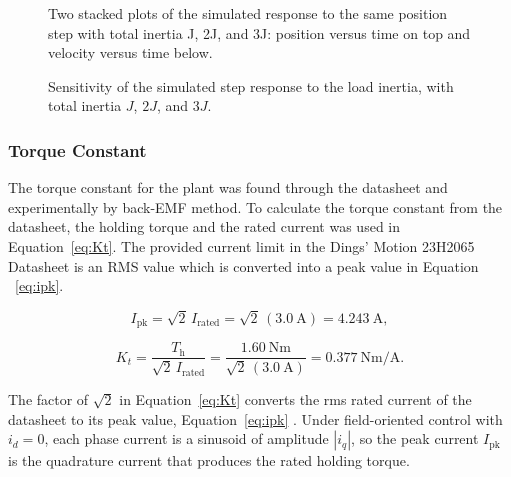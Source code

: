 \begin{figure}[htbp]
	\centering
		{Two stacked plots of the simulated response to the same position step with total inertia J, 2J, and 3J: position versus time on top and velocity versus time below.}
	\caption[Sensitivity of the step response to load inertia]{Sensitivity of the simulated step response to the load inertia, with total inertia $J$, $2J$, and $3J$.}
	\label{fig:inertia_sensitivity}
\end{figure}




\subsubsection{Torque Constant}
The torque constant for the plant was found through the datasheet and experimentally by back-EMF method. 
To calculate the torque constant from the datasheet, the holding torque and the rated current was used in Equation~\eqref{eq:Kt}. The provided current limit in the Dings' Motion 23H2065 Datasheet is an RMS value which is converted into a peak value in Equation ~\eqref{eq:ipk}.


\begin{equation}
	I_{\mathrm{pk}} = \sqrt{2}\, I_{\mathrm{rated}}
	= \sqrt{2}\,(\SI{3.0}{\ampere}) = \SI{4.243}{\ampere},\label{eq:ipk}
\end{equation}

\begin{equation}
	K_t = \frac{T_{\mathrm{h}}}{\sqrt{2}\, I_{\mathrm{rated}}}
	= \frac{\SI{1.60}{\newton\meter}}{\sqrt{2}\,(\SI{3.0}{\ampere})}
	= \SI{0.377}{\newton\meter\per\ampere}.\label{eq:Kt}
\end{equation}

The factor of $\sqrt{2}$ in Equation~\eqref{eq:Kt} converts the rms rated current of the datasheet to its peak value, Equation~\eqref{eq:ipk} \cite{dings_nema23_2026}. Under field-oriented control with $i_d = 0$, each phase current is a sinusoid of amplitude $|i_q|$, so the peak current $I_{\mathrm{pk}}$ is the quadrature current that produces the rated holding torque.

